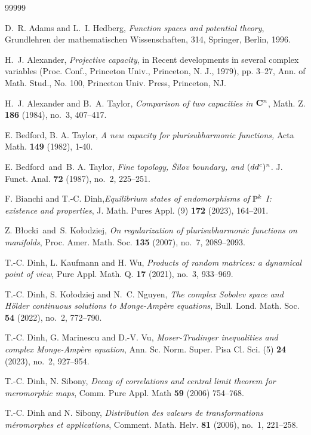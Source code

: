 \documentclass{amsart}
\theoremstyle{definition}
\numberwithin{thm}{section}
\numberwithin{equation}{section}
\renewcommand{\[}{\begin{equation}}
\renewcommand{\]}{\end{equation}}
\begin{document}
\begin{thebibliography}{99999}

 D.~R. Adams and L.~I. Hedberg, {\it Function spaces and potential theory}, Grundlehren der mathematischen Wissenschaften, 314, Springer, Berlin, 1996.


 H.~J. Alexander, {\it Projective capacity}, in  Recent developments in several complex variables (Proc. Conf., Princeton Univ., Princeton, N. J., 1979), pp. 3--27, Ann. of Math. Stud., No. 100, Princeton Univ. Press, Princeton, NJ.


H.~J. Alexander and B.~A. Taylor, {\it Comparison of two capacities in ${\bf C}\sp{n}$}, Math. Z. {\bf 186} (1984), no.~3, 407--417.

 E. Bedford, B. A. Taylor, 
{\it A new capacity for plurisubharmonic functions,} Acta Math. {\bf149} (1982), 1-40.

 E. Bedford\ and\ B. A. Taylor, {\it Fine topology, \v Silov boundary, and $(dd\sp c)\sp n$.} J. Funct. Anal. {\bf 72} (1987), no.~2, 225--251.

F. Bianchi and T.-C. Dinh,{\it  Equilibrium states of endomorphisms of $\Bbb P ^k$ I: existence and properties}, J. Math. Pures Appl. (9) {\bf 172} (2023), 164--201.


Z. B\l ocki\ and\ S. Ko\l odziej, {\it On regularization of plurisubharmonic functions on manifolds}, Proc. Amer. Math. Soc. {\bf 135} (2007), no.~7, 2089--2093.


T.-C. Dinh, L. Kaufmann and H. Wu, {\it Products of random matrices: a dynamical point of view}, Pure Appl. Math. Q. {\bf 17} (2021), no.~3, 933--969.

T.-C. Dinh, S. Ko\l odziej and N.~C. Nguyen, {\it The complex Sobolev space and H\"older continuous solutions to Monge-Amp\`ere equations}, Bull. Lond. Math. Soc. {\bf 54} (2022), no.~2, 772--790.

 T.-C. Dinh, G. Marinescu and D.-V. Vu, {\it Moser-Trudinger inequalities and complex Monge-Amp\`ere equation}, Ann. Sc. Norm. Super. Pisa Cl. Sci. (5) {\bf 24} (2023), no.~2, 927--954.


 T.-C. Dinh, N. Sibony, {\it Decay of correlations and central limit theorem for meromorphic maps}, 
Comm. Pure Appl. Math {\bf 59} (2006) 754--768.

T.-C. Dinh and N. Sibony, {\it Distribution des valeurs de transformations m\'eromorphes et applications}, Comment. Math. Helv. {\bf 81} (2006), no.~1, 221--258.


\end{thebibliography}
\end{document}

